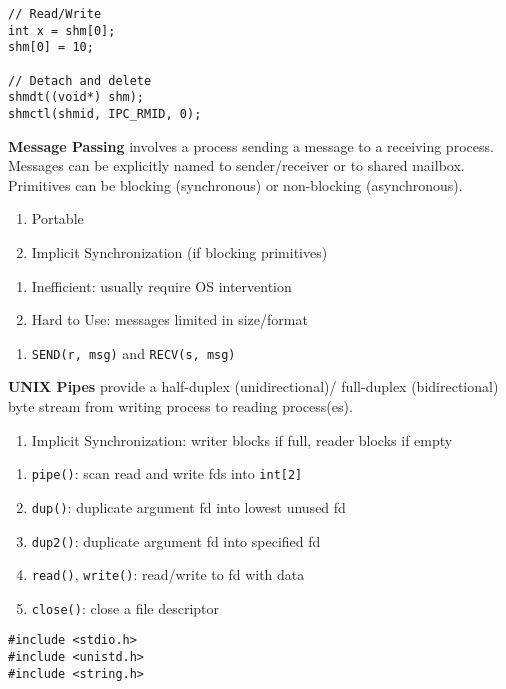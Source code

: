 \documentclass[12pt, a4paper]{article}
\begin{document}
\begin{multicols*}{3}
\begin{lstlisting}
// Read/Write 
int x = shm[0];
shm[0] = 10;

// Detach and delete
shmdt((void*) shm);
shmctl(shmid, IPC_RMID, 0);
\end{lstlisting}

\textbf{Message Passing} involves a process sending a message to a receiving process. Messages can be explicitly named to sender/receiver or to shared mailbox. Primitives can be blocking (synchronous) or non-blocking (asynchronous).
\begin{enumerate}[$+$]
  \item Portable 
  \item Implicit Synchronization (if blocking primitives)
\end{enumerate}\vspace{-1pt}
\begin{enumerate}[$-$]
  \item Inefficient: usually require OS intervention
  \item Hard to Use: messages limited in size/format
\end{enumerate}\vspace{-1pt}
\begin{enumerate}[\roman*.]
  \item \lstinline|SEND(r, msg)| and \lstinline|RECV(s, msg)|
\end{enumerate}

\colbreak
\textbf{UNIX Pipes} provide a half-duplex (unidirectional)/ full-duplex (bidirectional) byte stream from writing process to reading process(es).
\begin{enumerate}[$+$]
  \item Implicit Synchronization: writer blocks if full, reader blocks if empty
\end{enumerate}\vspace{-1pt}
\begin{enumerate}[\roman*.]
  \item \lstinline|pipe()|: scan read and write fds into \lstinline|int[2]| 
  \item \lstinline|dup()|: duplicate argument fd into lowest unused fd 
  \item \lstinline|dup2()|: duplicate argument fd into specified fd 
  \item \lstinline|read()|, \lstinline|write()|: read/write to fd with data
  \item \lstinline|close()|: close a file descriptor
\end{enumerate}
\begin{lstlisting}
#include <stdio.h>
#include <unistd.h>
#include <string.h>


\end{lstlisting}
\end{multicols*}
\end{document}
